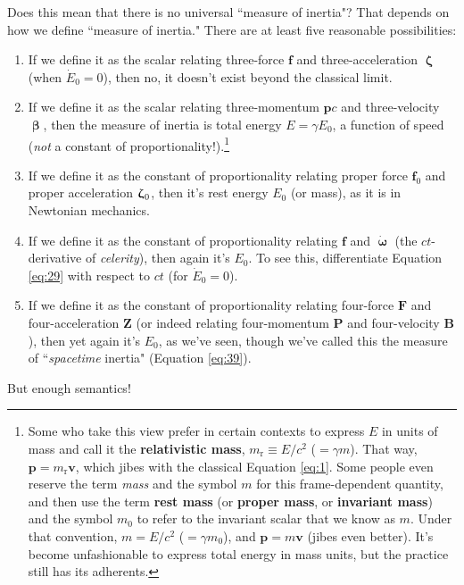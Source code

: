 \documentclass[12pt]{article}
\renewcommand{\vv}[1]{\mathbf{#1}}
\newcommand{\vvbeta}{\bm{\upbeta}}
\newcommand{\vvomega}{\bm{\upomega}}
\newcommand{\vvzeta}{\bm{\upzeta}}
\begin{document}
Does this mean that there is no universal ``measure of inertia"? That depends on how we define ``measure of inertia." There are at least five reasonable possibilities:
\begin{enumerate}
\item If we define it as the scalar relating three-force $\vv f$ and three-acceleration $\vvzeta$ (when $\dot{E}_0 = 0$), then no, it doesn't exist beyond the classical limit.
\item If we define it as the scalar relating three-momentum $\vv p c$ and three-velocity $\vvbeta$, then the measure of inertia is total energy $E = \gamma E_0$, a function of speed (\emph{not} a constant of proportionality!).\footnote{\label{fn:rm}Some who take this view prefer in certain contexts to express $E$ in units of mass and call it the \textbf{relativistic mass}, $m_{\textrm{r}} \equiv E / c^2$ ($= \gamma m$). That way, $\vv p = m_{\textrm{r}} \vv v$, which jibes with the classical Equation \ref{eq:1}. Some people even reserve the term \emph{mass} and the symbol $m$ for this frame-dependent quantity, and then use the term \textbf{rest mass} (or \textbf{proper mass}, or \textbf{invariant mass}) and the symbol $m_0$ to refer to the invariant scalar that we know as $m$. Under that convention, $m = E / c^2$ ($ = \gamma m_0$), and $\vv p = m \vv v$ (jibes even better). It's become unfashionable to express total energy in mass units, but the practice still has its adherents.}
\item If we define it as the constant of proportionality relating proper force $\vv f_0$ and proper acceleration $\vvzeta_{\mkern1mu 0}$, then it's rest energy $E_0$ (or mass), as it is in Newtonian mechanics.
\item If we define it as the constant of proportionality relating $\vv f$ and $\dot{\vvomega}$ (the $ct$-derivative of \emph{celerity}), then again it's $E_0$. To see this, differentiate Equation \ref{eq:29} with respect to $ct$ (for $\dot{E}_0 = 0$).
\item If we define it as the constant of proportionality relating four-force $\vv F$ and four-acceleration $\vv Z$ (or indeed relating four-momentum $\vv P$ and four-velocity $\vv B$), then yet again it's $E_0$, as we've seen, though we've called this the measure of ``\emph{spacetime} inertia" (Equation \ref{eq:39}).
\end{enumerate}

But enough semantics!
\end{document}
